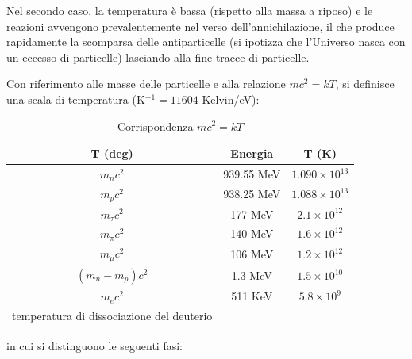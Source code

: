 Nel secondo caso, la temperatura è bassa (rispetto alla massa a riposo) e le
reazioni avvengono prevalentemente nel verso dell'annichilazione, il che produce
rapidamente la scomparsa delle antiparticelle (si ipotizza che l'Universo nasca
con un eccesso di particelle) lasciando alla fine tracce di particelle.


Con riferimento alle masse delle particelle e alla relazione $m c^2 = kT$, si
definisce una scala di temperatura (K$^{-1} = 11604$ Kelvin/eV):
\begin{table}
  \centering{}
  \caption{Corrispondenza $m c^2 = kT$}
  \label{massa_temp}
  \begin{tabular}{ccc}
    \toprule
    T (deg)         & Energia    & T (K)              \\
    \midrule
    $m_n c^2$       & 939.55 MeV & $1.090 \times 10^{13}$ \\
    $m_p c^2 $      & 938.25 MeV & $1.088 \times 10^{13}$ \\
    $m_{\tau}c^2$   & 177    MeV & $2.1   \times 10^{12}$ \\
    $m_{\pi} c^2$   & 140    MeV & $1.6   \times 10^{12}$ \\
    $m_{\mu} c^2 $  & 106    MeV & $1.2   \times 10^{12}$ \\
    $(m_n-m_p) c^2$ & 1.3    MeV & $1.5   \times 10^{10}$ \\
    $m_e c^2      $ & 511    KeV & $5.8   \times 10^{9 }$ \\
    temperatura di dissociazione del deuterio \\ 
    \bottomrule
  \end{tabular}
\end{table}
in cui si distinguono le seguenti fasi:
